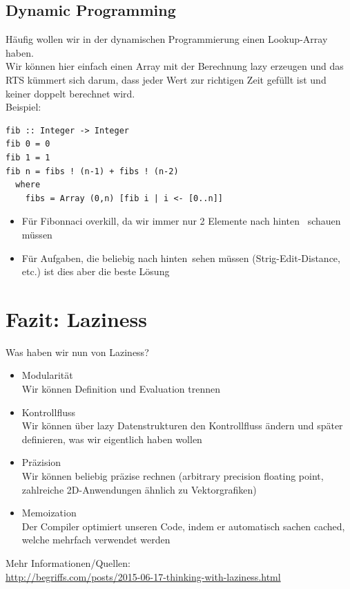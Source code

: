 \documentclass{beamer}
\begin{document}
\subsection{Dynamic Programming}

\begin{frame}[fragile]
Häufig wollen wir in der dynamischen Programmierung einen Lookup-Array haben.\\\pause
Wir können hier einfach einen Array mit der Berechnung lazy erzeugen und das RTS kümmert sich darum, dass jeder Wert zur richtigen Zeit gefüllt ist und keiner doppelt berechnet wird.\\\pause
Beispiel:
\begin{verbatim}
fib :: Integer -> Integer
fib 0 = 0
fib 1 = 1
fib n = fibs ! (n-1) + fibs ! (n-2)
  where
    fibs = Array (0,n) [fib i | i <- [0..n]]
\end{verbatim}
\pause
\begin{itemize}
 \item Für Fibonnaci overkill, da wir immer nur 2 Elemente \glqq nach hinten \grqq \ schauen müssen
 \pause
 \item Für Aufgaben, die beliebig \glqq nach hinten\grqq \ sehen müssen (Strig-Edit-Distance, etc.) ist dies aber die beste Lösung
\end{itemize}

\end{frame}

\section{Fazit: Laziness}

\begin{frame}[fragile]
Was haben wir nun von Laziness?\\\pause
\begin{itemize}
 \item Modularität\\\pause
       Wir können Definition und Evaluation trennen
 \pause
 \item Kontrollfluss\\\pause
       Wir können über lazy Datenstrukturen den Kontrollfluss ändern und später definieren, was wir eigentlich haben wollen
 \pause
 \item Präzision\\\pause
       Wir können beliebig präzise rechnen (arbitrary precision floating point, zahlreiche 2D-Anwendungen ähnlich zu Vektorgrafiken)
 \pause
 \item Memoization\\\pause
       Der Compiler optimiert unseren Code, indem er automatisch sachen cached, welche mehrfach verwendet werden
\end{itemize}
\pause
Mehr Informationen/Quellen:\\
\url{http://begriffs.com/posts/2015-06-17-thinking-with-laziness.html}
\end{frame}
\end{document}
